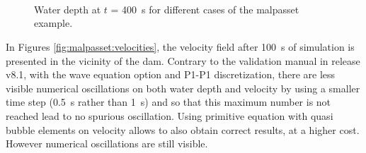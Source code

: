 \begin{figure}[H]
  \centering
  \\
  \\
  \\
  \caption{Water depth at $t$ = 400~s for different cases of the malpasset example.}
  \label{fig:malpasset:WD_all2}
\end{figure}

In Figures \ref{fig:malpasset:velocities}, the velocity field after 100~s of
simulation is presented in the vicinity of the dam.
Contrary to the  validation manual in release v8.1,
with the wave equation option and P1-P1 discretization, there are less visible
numerical oscillations on both water depth and velocity by
using a smaller time step (0.5~s rather than 1~s) and
 so that this maximum
number is not reached lead to no spurious oscillation.
Using primitive equation with quasi bubble elements on velocity allows to also
obtain correct results, at a higher cost.
However numerical oscillations are still visible.

